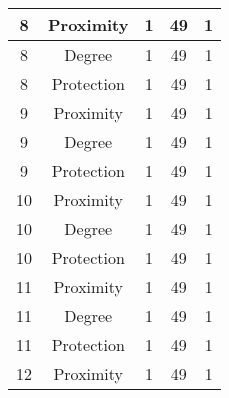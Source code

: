 \documentclass[results.tex]{subfiles}
\begin{document}
\begin{center}
\begin{tabular}{| c || c | c | c | c |}
            \hline
            8                       & Proximity                    & 1                      & 49                      & 1                    \\
            \hline
            8                       & Degree                       & 1                      & 49                      & 1                    \\
            \hline
            8                       & Protection                   & 1                      & 49                      & 1                    \\
            \hline
            9                       & Proximity                    & 1                      & 49                      & 1                    \\
            \hline
            9                       & Degree                       & 1                      & 49                      & 1                    \\
            \hline
            9                       & Protection                   & 1                      & 49                      & 1                    \\
            \hline
            10                      & Proximity                    & 1                      & 49                      & 1                    \\
            \hline
            10                      & Degree                       & 1                      & 49                      & 1                    \\
            \hline
            10                      & Protection                   & 1                      & 49                      & 1                    \\
            \hline
            11                      & Proximity                    & 1                      & 49                      & 1                    \\
            \hline
            11                      & Degree                       & 1                      & 49                      & 1                    \\
            \hline
            11                      & Protection                   & 1                      & 49                      & 1                    \\
            \hline
            12                      & Proximity                    & 1                      & 49                      & 1                    \\

\end{tabular}
\end{center}
\end{document}
